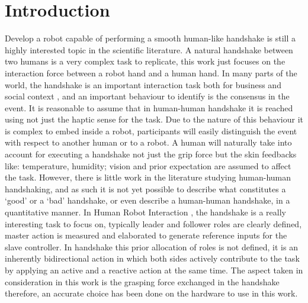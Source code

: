 \chapter*{Introduction}
Develop a robot capable of performing a smooth human-like handshake is still a highly interested topic in the scientific literature.
A natural handshake between two humans is a very complex task to replicate, this work just focuses on the interaction force between a robot hand and a human hand.
In many parts of the world, the handshake is an important interaction task both for business and social context \cite{chaplin2000handshaking}, and an important behaviour to identify is the consensus in the event. It is reasonable to assume that in human-human handshake it is reached using not just the haptic sense for the task. Due to the nature of this behaviour it is complex to embed inside a robot, participants will easily distinguish the event with respect to another human or to a robot. A human will naturally take into account for executing a handshake not just the grip force but the skin feedbacks like: temperature, humidity; vision and prior expectation are assumed to affect the task. However, there is little work in the literature studying human-human handshaking, and as such it is not yet possible to describe what constitutes a ‘good’ or a ‘bad’ handshake, or even describe a human-human handshake, in a quantitative manner.
In Human Robot Interaction \cite{sheridan2016human}, the handshake is a really interesting task to focus on, typically leader and follower roles are clearly defined, master action is measured and elaborated to generate reference inputs for the slave controller. In handshake this prior allocation of roles is not defined, it is an inherently bidirectional action in which both sides actively contribute to the task by applying an active and a reactive action at the same time.
The aspect taken in consideration in this work is the grasping force exchanged in the handshake therefore, an accurate choice has been done on the hardware to use in this work.
